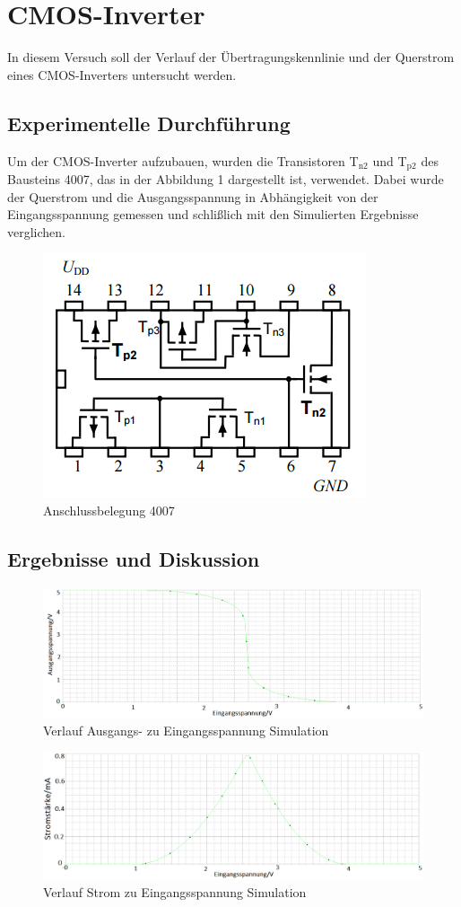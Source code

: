\section{CMOS-Inverter}
In diesem Versuch soll der Verlauf der \"Ubertragungskennlinie und der Querstrom eines CMOS-Inverters untersucht werden.
\subsection{Experimentelle Durchf\"uhrung}
Um der CMOS-Inverter aufzubauen, wurden die Transistoren T$_{\text{n2}}$ und T$_{\text{p2}}$ des Bausteins 4007, das in der Abbildung 1 dargestellt ist, verwendet. Dabei wurde der Querstrom und die Ausgangsspannung in Abh\"angigkeit von der Eingangsspannung gemessen und schli\ss lich mit den Simulierten Ergebnisse verglichen.
\begin{figure}[!h]
\begin{center}
\includegraphics[scale=0.8]{bild/CMOS-Inverter}
\caption{Anschlussbelegung 4007}
\end{center}
\end{figure}
\subsection{Ergebnisse und Diskussion}
\begin{figure}[!h]
\includegraphics[scale=0.35]{bild/AusgangEingangCMOS}
\caption{Verlauf Ausgangs- zu Eingangsspannung Simulation}
\end{figure}
\begin{figure}[!h]
\includegraphics[scale=0.35]{bild/StromEingangCMOS}
\caption{Verlauf Strom zu Eingangsspannung Simulation}
\end{figure}